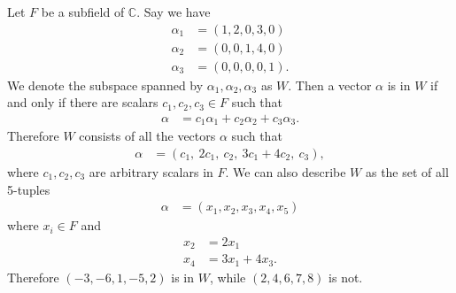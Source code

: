 \documentclass[12pt]{article}
\begin{document}
\begin{exm}
  Let $F$ be a subfield of $\mathbb{C}$. Say we have
  \begin{align*}
    \alpha_1 &= (1,2,0,3,0)\\
    \alpha_2 &= (0,0,1,4,0)\\
    \alpha_3 &= (0,0,0,0,1).
  \end{align*}
  We denote the subspace spanned by $\alpha_1,\alpha_2,\alpha_3$ as $W$. Then a
  vector $\alpha$ is in $W$ if and only if there are scalars $c_1,c_2,c_3 \in F$ such
  that
  \begin{align*}
    \alpha &= c_1\alpha_1 + c_2\alpha_2 + c_3\alpha_3.
  \end{align*}
  Therefore $W$ consists of all the vectors $\alpha$ such that
  \begin{align*}
    \alpha &= (c_1,\ 2c_1,\ c_2,\ 3c_1+4c_2,\ c_3),
  \end{align*}
  where $c_1,c_2,c_3$ are arbitrary scalars in $F$. We can also describe $W$ as the
  set of all 5-tuples
  \begin{align*}
    \alpha &= (x_1,x_2,x_3,x_4,x_5)
  \end{align*}
  where $x_i \in F$ and
  \begin{align*}
    x_2 &= 2x_1\\
    x_4 &= 3x_1 + 4x_3.
  \end{align*}
  Therefore $(-3,-6,1,-5,2)$ is in $W$, while $(2,4,6,7,8)$ is not.
\end{exm}
\end{document}
